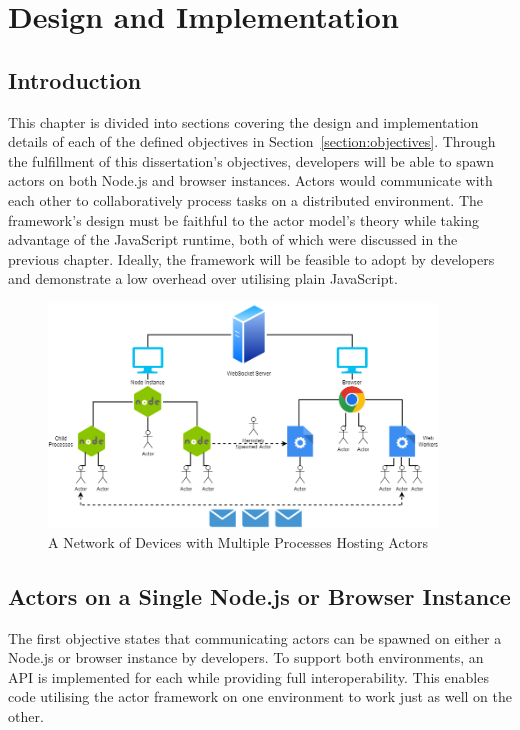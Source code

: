 \documentclass[oneside]{um-fict}
\begin{document}
\chapter{Design and Implementation}\label{chap:design}
\section{Introduction}

This chapter is divided into sections covering the design and implementation details of each of the defined objectives in Section~\ref{section:objectives}. Through the fulfillment of this dissertation's objectives, developers will be able to spawn actors on both Node.js and browser instances. Actors would communicate with each other to collaboratively process tasks on a distributed environment. The framework’s design must be faithful to the actor model’s theory while taking advantage of the JavaScript runtime, both of which were discussed in the previous chapter. Ideally, the framework will be feasible to adopt by developers and demonstrate a low overhead over utilising plain JavaScript.

\begin{figure}[H]
    \begin{centering}
        \includegraphics[width=390px]{resources/network.png}
        \caption{A Network of Devices with Multiple Processes Hosting Actors}
    \end{centering}\label{fig:network}
\end{figure}
\section{Actors on a Single Node.js or Browser Instance}
The first objective states that communicating actors can be spawned on either a Node.js or browser instance by developers. To support both environments, an API is implemented for each while providing full interoperability. This enables code utilising the actor framework on one environment to work just as well on the other.
\end{document}
